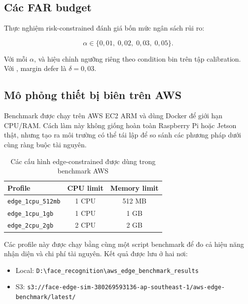 \subsection{Các FAR budget}

Thực nghiệm risk-constrained đánh giá bốn mức ngân sách rủi ro:

\begin{equation}
    \alpha \in \{0{,}01,\;0{,}02,\;0{,}03,\;0{,}05\}.
\end{equation}

Với mỗi $\alpha$,  và  hiệu chỉnh ngưỡng riêng theo condition bin trên tập calibration. Với , margin defer là $\delta=0{,}03$.

\subsection{Mô phỏng thiết bị biên trên AWS}

Benchmark được chạy trên AWS EC2 ARM và dùng Docker để giới hạn CPU/RAM. Cách làm này không giống hoàn toàn Raspberry Pi hoặc Jetson thật, nhưng tạo ra môi trường có thể tái lập để so sánh các phương pháp dưới cùng ràng buộc tài nguyên.

\begin{table}[!htbp]
\centering
\caption{Các cấu hình edge-constrained được dùng trong benchmark AWS}
\label{tab:aws_profiles}
\begin{tabular}{lcc}
\toprule
\textbf{Profile} & \textbf{CPU limit} & \textbf{Memory limit} \\
\midrule
\texttt{edge\_1cpu\_512mb} & 1 CPU & 512 MB \\
\texttt{edge\_1cpu\_1gb}   & 1 CPU & 1 GB \\
\texttt{edge\_2cpu\_2gb}   & 2 CPU & 2 GB \\
\bottomrule
\end{tabular}
\end{table}

Các profile này được chạy bằng cùng một script benchmark để đo cả hiệu năng nhận diện và chi phí tài nguyên. Kết quả được lưu ở hai nơi:

\begin{itemize}
    \item Local: \texttt{D:\textbackslash face\_recognition\textbackslash aws\_edge\_benchmark\_results}
    \item S3: \texttt{s3://face-edge-sim-380269593136-ap-southeast-1/aws-edge-benchmark/latest/}
\end{itemize}

